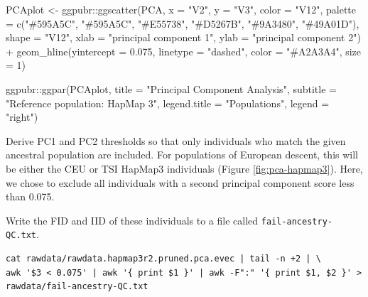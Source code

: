 \documentclass[
]{book}
\newenvironment{Shaded}{\begin{snugshade}}{\end{snugshade}}
\newcommand{\AttributeTok}[1]{\textcolor[rgb]{0.77,0.63,0.00}{#1}}
\newcommand{\DecValTok}[1]{\textcolor[rgb]{0.00,0.00,0.81}{#1}}
\newcommand{\FloatTok}[1]{\textcolor[rgb]{0.00,0.00,0.81}{#1}}
\newcommand{\FunctionTok}[1]{\textcolor[rgb]{0.00,0.00,0.00}{#1}}
\newcommand{\NormalTok}[1]{#1}
\newcommand{\OtherTok}[1]{\textcolor[rgb]{0.56,0.35,0.01}{#1}}
\newcommand{\SpecialCharTok}[1]{\textcolor[rgb]{0.00,0.00,0.00}{#1}}
\newcommand{\StringTok}[1]{\textcolor[rgb]{0.31,0.60,0.02}{#1}}
\begin{document}
\begin{Shaded}
\begin{Highlighting}[]
\NormalTok{PCAplot }\OtherTok{\textless{}{-}}\NormalTok{ ggpubr}\SpecialCharTok{::}\FunctionTok{ggscatter}\NormalTok{(PCA, }\AttributeTok{x =} \StringTok{"V2"}\NormalTok{, }\AttributeTok{y =} \StringTok{"V3"}\NormalTok{,}
                             \AttributeTok{color =} \StringTok{"V12"}\NormalTok{,}
                             \AttributeTok{palette =} \FunctionTok{c}\NormalTok{(}\StringTok{"\#595A5C"}\NormalTok{, }\StringTok{"\#595A5C"}\NormalTok{, }\StringTok{"\#E55738"}\NormalTok{, }\StringTok{"\#D5267B"}\NormalTok{, }\StringTok{"\#9A3480"}\NormalTok{, }\StringTok{"\#49A01D"}\NormalTok{),}
                             \AttributeTok{shape =} \StringTok{"V12"}\NormalTok{,}
                             \AttributeTok{xlab =} \StringTok{"principal component 1"}\NormalTok{, }\AttributeTok{ylab =} \StringTok{"principal component 2"}\NormalTok{) }\SpecialCharTok{+}
  \FunctionTok{geom\_hline}\NormalTok{(}\AttributeTok{yintercept =} \FloatTok{0.075}\NormalTok{, }\AttributeTok{linetype =} \StringTok{"dashed"}\NormalTok{,}
                \AttributeTok{color =} \StringTok{"\#A2A3A4"}\NormalTok{, }\AttributeTok{size =} \DecValTok{1}\NormalTok{)}

\NormalTok{  ggpubr}\SpecialCharTok{::}\FunctionTok{ggpar}\NormalTok{(PCAplot,}
                \AttributeTok{title =} \StringTok{"Principal Component Analysis"}\NormalTok{,}
                \AttributeTok{subtitle =} \StringTok{"Reference population: HapMap 3"}\NormalTok{,}
                \AttributeTok{legend.title =} \StringTok{"Populations"}\NormalTok{, }\AttributeTok{legend =} \StringTok{"right"}\NormalTok{)}
\end{Highlighting}
\end{Shaded}

Derive PC1 and PC2 thresholds so that only individuals who match the given ancestral population are included. For populations of European descent, this will be either the CEU or TSI HapMap3 individuals (Figure \ref{fig:pca-hapmap3}). Here, we chose to exclude all individuals with a second principal component score less than 0.075.

Write the FID and IID of these individuals to a file called \texttt{fail-ancestry-QC.txt}.

\begin{verbatim}
cat rawdata/rawdata.hapmap3r2.pruned.pca.evec | tail -n +2 | \
awk '$3 < 0.075' | awk '{ print $1 }' | awk -F":" '{ print $1, $2 }' > rawdata/fail-ancestry-QC.txt
\end{verbatim}
\end{document}

